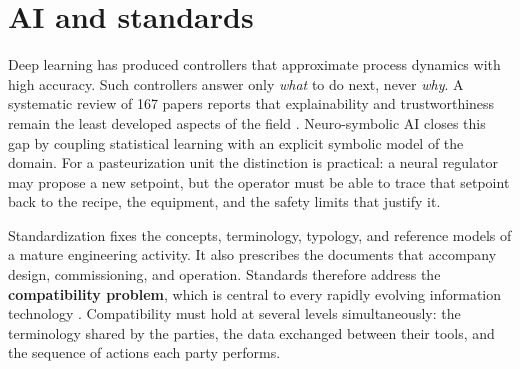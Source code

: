 

\section{AI and standards}

Deep learning has produced controllers that approximate process dynamics with
high accuracy. Such controllers answer only \emph{what} to do next, never
\emph{why}. A systematic review of 167 papers reports that explainability and
trustworthiness remain the least developed aspects of the field
\cite{Colelough2025}. Neuro-symbolic AI closes this gap by coupling statistical
learning with an explicit symbolic model of the domain. For a pasteurization
unit the distinction is practical: a neural regulator may propose a new
setpoint, but the operator must be able to trace that setpoint back to the
recipe, the equipment, and the safety limits that justify it.

Standardization fixes the concepts, terminology, typology, and reference models
of a mature engineering activity. It also prescribes the documents that
accompany design, commissioning, and operation. Standards therefore address the
\textbf{compatibility problem}, which is central to every rapidly evolving
information technology \cite{Golenkov2019}. Compatibility must hold at several
levels simultaneously: the terminology shared by the parties, the data exchanged
between their tools, and the sequence of actions each party performs.

